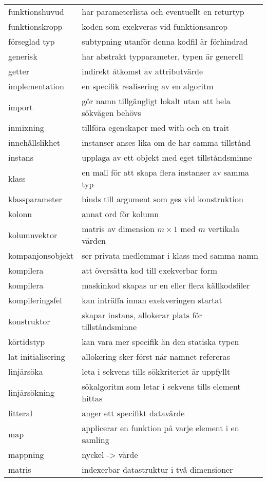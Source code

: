 \begin{tabular}{l|l}
funktionshuvud & har parameterlista och eventuellt en returtyp \\
funktionskropp & koden som exekveras vid funktionsanrop \\
förseglad typ & subtypning utanför denna kodfil är förhindrad \\
generisk & har abstrakt typparameter, typen är generell \\
getter & indirekt åtkomst av attributvärde \\
implementation & en specifik realisering av en algoritm \\
import & gör namn tillgängligt lokalt utan att hela sökvägen behövs \\
inmixning & tillföra egenskaper med with och en trait \\
innehållslikhet & instanser anses lika om de har samma tillstånd \\
instans & upplaga av ett objekt med eget tillståndsminne \\
klass & en mall för att skapa flera instanser av samma typ \\
klassparameter & binds till argument som ges vid konstruktion \\
kolonn & annat ord för kolumn \\
kolumnvektor & matris av dimension $m\times{}1$ med $m$ vertikala värden \\
kompanjonsobjekt & ser privata medlemmar i klass med samma namn \\
kompilera & att översätta kod till exekverbar form \\
kompilera & maskinkod skapas ur en eller flera källkodsfiler \\
kompileringsfel & kan inträffa innan exekveringen startat \\
konstruktor & skapar instans, allokerar plats för tillståndsminne \\
körtidstyp & kan vara mer specifik än den statiska typen \\
lat initialisering & allokering sker först när namnet refereras \\
linjärsöka & leta i sekvens tills sökkriteriet är uppfyllt \\
linjärsökning & sökalgoritm som letar i sekvens tills element hittas \\
litteral & anger ett specifikt datavärde \\
map & applicerar en funktion på varje element i en samling \\
mappning & nyckel -> värde \\
matris & indexerbar datastruktur i två dimensioner \\

\end{tabular}
